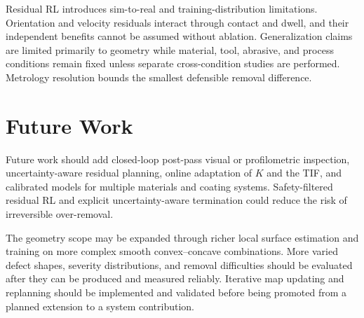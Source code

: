 Residual RL introduces sim-to-real and training-distribution limitations. Orientation and velocity residuals interact through contact and dwell, and their independent benefits cannot be assumed without ablation. Generalization claims are limited primarily to geometry while material, tool, abrasive, and process conditions remain fixed unless separate cross-condition studies are performed. Metrology resolution bounds the smallest defensible removal difference.

\section{Future Work}
Future work should add closed-loop post-pass visual or profilometric inspection, uncertainty-aware residual planning, online adaptation of \(K\) and the TIF, and calibrated models for multiple materials and coating systems. Safety-filtered residual RL and explicit uncertainty-aware termination could reduce the risk of irreversible over-removal.

The geometry scope may be expanded through richer local surface estimation and training on more complex smooth convex--concave combinations. More varied defect shapes, severity distributions, and removal difficulties should be evaluated after they can be produced and measured reliably. Iterative map updating and replanning should be implemented and validated before being promoted from a planned extension to a system contribution.
